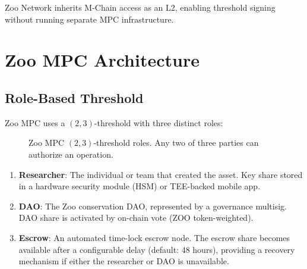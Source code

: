 \documentclass[11pt,letterpaper]{article}
\begin{document}
Zoo Network inherits M-Chain access as an L2, enabling threshold signing without running separate MPC infrastructure.

\section{Zoo MPC Architecture}
\label{sec:architecture}

\subsection{Role-Based Threshold}

Zoo MPC uses a $(2, 3)$-threshold with three distinct roles:

\begin{figure}[t]
\centering
{}
\caption{Zoo MPC $(2, 3)$-threshold roles. Any two of three parties can authorize an operation.}
\label{fig:roles}
\end{figure}

\begin{enumerate}
    \item \textbf{Researcher}: The individual or team that created the asset. Key share stored in a hardware security module (HSM) or TEE-backed mobile app.

    \item \textbf{DAO}: The Zoo conservation DAO, represented by a governance multisig. DAO share is activated by on-chain vote (ZOO token-weighted).

    \item \textbf{Escrow}: An automated time-lock escrow node. The escrow share becomes available after a configurable delay (default: 48 hours), providing a recovery mechanism if either the researcher or DAO is unavailable.
\end{enumerate}
\end{document}
